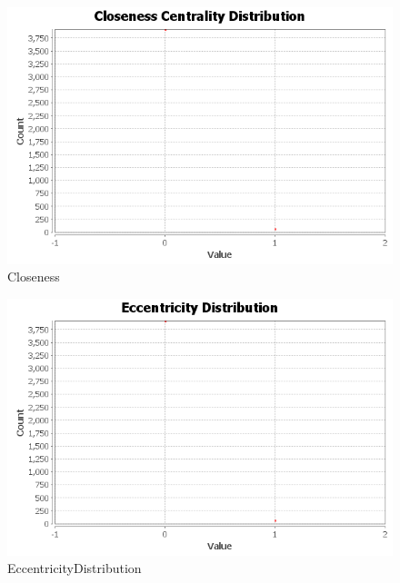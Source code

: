 \documentclass[12pt]{article}
\begin{document}
\begin{figure}[!ht]
\includegraphics[scale=0.7]{../Q3/network/ClosenessCentralityDistribution}
\centering
\caption{Closeness}
\end{figure}
\newpage
\begin{figure}[!ht]
\includegraphics[scale=0.7]{../Q3/network/EccentricityDistribution}
\centering
\caption{EccentricityDistribution}
\end{figure}
\newpage
\end{document}
